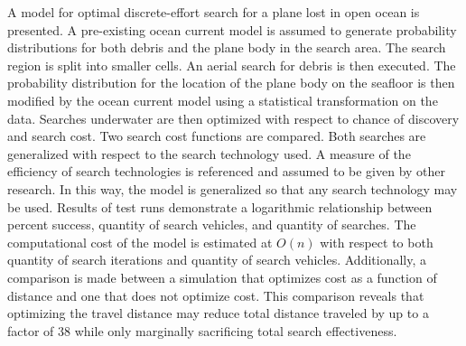 \documentclass[a4paper]{article}
\begin{document}
A model for optimal discrete-effort search for a plane lost in open ocean is presented. A pre-existing ocean current model is assumed to generate probability distributions for both debris and the plane body in the search area. The search region is split into smaller cells. An aerial search for debris is then executed. The probability distribution for the location of the plane body on the seafloor is then modified by the ocean current model using a statistical transformation on the data. Searches underwater are then optimized with respect to chance of discovery and search cost. Two search cost functions are compared. Both searches are generalized with respect to the search technology used. A measure of the efficiency of search technologies is referenced and assumed to be given by other research. In this way, the model is generalized so that any search technology may be used. Results of test runs demonstrate a logarithmic relationship between percent success, quantity of search vehicles, and quantity of searches. The computational cost of the model is estimated at $O(n)$ with respect to both quantity of search iterations and quantity of search vehicles. Additionally, a comparison is made between a simulation that optimizes cost as a function of distance and one that does not optimize cost. This comparison reveals that optimizing the travel distance may reduce total distance traveled by up to a factor of 38 while only marginally sacrificing total search effectiveness.
\end{document}
